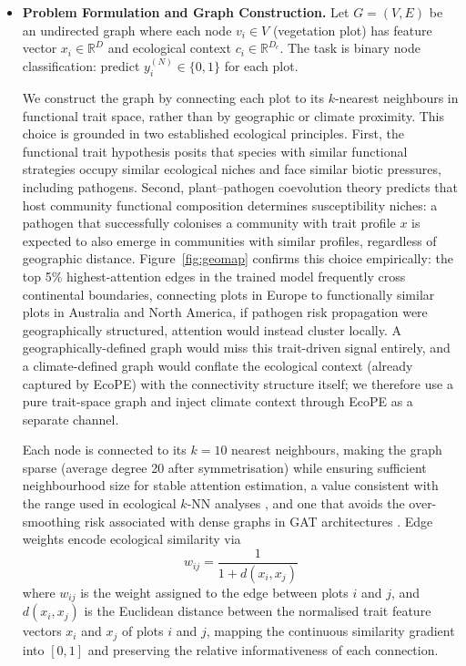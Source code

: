 \documentclass[a4paper,fleqn]{cas-sc}
\begin{document}
\begin{itemize}[leftmargin=1.4em]

\item \textbf{Problem Formulation and Graph Construction.} Let $G=(V,E)$ be an undirected graph where each node $v_i \in V$ (vegetation plot) has feature vector $x_i \in \mathbb{R}^D$ and ecological context $c_i \in \mathbb{R}^{D_c}$. The task is binary node classification: predict $y_i^{(N)} \in \{0,1\}$ for each plot.

We construct the graph by connecting each plot to its $k$-nearest neighbours in functional trait space, rather than by geographic or climate proximity. This choice is grounded in two established ecological principles. First, the functional trait hypothesis posits that species with similar functional strategies occupy similar ecological niches and face similar biotic pressures, including pathogens. Second, plant--pathogen coevolution theory predicts that host community functional composition determines susceptibility niches: a pathogen that successfully colonises a community with trait profile $x$ is expected to also emerge in communities with similar profiles, regardless of geographic distance. Figure~\ref{fig:geomap} confirms this choice empirically: the top 5\% highest-attention edges in the trained model frequently cross continental boundaries, connecting plots in Europe to functionally similar plots in Australia and North America, if pathogen risk propagation were geographically structured, attention would instead cluster locally. A geographically-defined graph would miss this trait-driven signal entirely, and a climate-defined graph would conflate the ecological context (already captured by EcoPE) with the connectivity structure itself; we therefore use a pure trait-space graph and inject climate context through EcoPE as a separate channel.

Each node is connected to its $k=10$ nearest neighbours, making the graph sparse (average degree 20 after symmetrisation) while ensuring sufficient neighbourhood size for stable attention estimation, a value consistent with the range used in ecological $k$-NN analyses \citep{bruelheide2018}, and one that avoids the over-smoothing risk associated with dense graphs in GAT architectures \citep{velickovic2018}. Edge weights encode ecological similarity via
\begin{equation}
w_{ij} = \frac{1}{1 + d(x_i, x_j)}
\end{equation}
where $w_{ij}$ is the weight assigned to the edge between plots $i$ and $j$, and $d(x_i, x_j)$ is the Euclidean distance between the normalised trait feature vectors $x_i$ and $x_j$ of plots $i$ and $j$, mapping the continuous similarity gradient into $[0,1]$ and preserving the relative informativeness of each connection.


\end{itemize}
\end{document}
